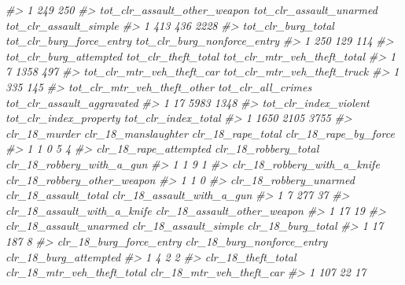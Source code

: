 \documentclass[
  12pt,
]{book}
\newenvironment{Shaded}{\begin{snugshade}}{\end{snugshade}}
\newcommand{\CommentTok}[1]{\textcolor[rgb]{0.56,0.35,0.01}{\textit{#1}}}
\begin{document}
\begin{Shaded}
\begin{Highlighting}[]
\CommentTok{\#> 1                        249                          250}
\CommentTok{\#>   tot\_clr\_assault\_other\_weapon tot\_clr\_assault\_unarmed tot\_clr\_assault\_simple}
\CommentTok{\#> 1                          413                     436                   2228}
\CommentTok{\#>   tot\_clr\_burg\_total tot\_clr\_burg\_force\_entry tot\_clr\_burg\_nonforce\_entry}
\CommentTok{\#> 1                250                      129                         114}
\CommentTok{\#>   tot\_clr\_burg\_attempted tot\_clr\_theft\_total tot\_clr\_mtr\_veh\_theft\_total}
\CommentTok{\#> 1                      7                1358                         497}
\CommentTok{\#>   tot\_clr\_mtr\_veh\_theft\_car tot\_clr\_mtr\_veh\_theft\_truck}
\CommentTok{\#> 1                       335                         145}
\CommentTok{\#>   tot\_clr\_mtr\_veh\_theft\_other tot\_clr\_all\_crimes tot\_clr\_assault\_aggravated}
\CommentTok{\#> 1                          17               5983                       1348}
\CommentTok{\#>   tot\_clr\_index\_violent tot\_clr\_index\_property tot\_clr\_index\_total}
\CommentTok{\#> 1                  1650                   2105                3755}
\CommentTok{\#>   clr\_18\_murder clr\_18\_manslaughter clr\_18\_rape\_total clr\_18\_rape\_by\_force}
\CommentTok{\#> 1             1                   0                 5                    4}
\CommentTok{\#>   clr\_18\_rape\_attempted clr\_18\_robbery\_total clr\_18\_robbery\_with\_a\_gun}
\CommentTok{\#> 1                     1                    9                         1}
\CommentTok{\#>   clr\_18\_robbery\_with\_a\_knife clr\_18\_robbery\_other\_weapon}
\CommentTok{\#> 1                           1                           0}
\CommentTok{\#>   clr\_18\_robbery\_unarmed clr\_18\_assault\_total clr\_18\_assault\_with\_a\_gun}
\CommentTok{\#> 1                      7                  277                        37}
\CommentTok{\#>   clr\_18\_assault\_with\_a\_knife clr\_18\_assault\_other\_weapon}
\CommentTok{\#> 1                          17                          19}
\CommentTok{\#>   clr\_18\_assault\_unarmed clr\_18\_assault\_simple clr\_18\_burg\_total}
\CommentTok{\#> 1                     17                   187                 8}
\CommentTok{\#>   clr\_18\_burg\_force\_entry clr\_18\_burg\_nonforce\_entry clr\_18\_burg\_attempted}
\CommentTok{\#> 1                       4                          2                     2}
\CommentTok{\#>   clr\_18\_theft\_total clr\_18\_mtr\_veh\_theft\_total clr\_18\_mtr\_veh\_theft\_car}
\CommentTok{\#> 1                107                         22                       17}

\end{Highlighting}
\end{Shaded}
\end{document}
